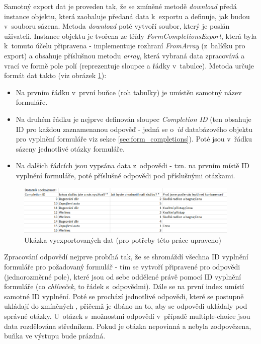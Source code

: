 			Samotný export dat je proveden tak, že se zmíněné metodě \textit{download} předá instance objektu, která zaobaluje předaná data k~exportu a definuje, jak budou v~souboru sázena. Metoda \textit{download} poté vytvoří soubor, který je poslán uživateli. Instance objektu je tvořena ze třídy \textit{FormCompletionsExport}, která byla k~tomuto účelu připravena - implementuje rozhraní \textit{FromArray} (z~balíčku pro export) a obsahuje příslušnou metodu \textit{array}, která vybraná data zpracovává a vrací ve formě pole polí (reprezentuje sloupce a řádky v~tabulce). Metoda určuje formát dat takto (viz obrázek \ref{fig:export_excel}):
			
			\begin{itemize}
				\item Na prvním řádku v~první buňce (roh tabulky) je umístěn samotný název formuláře.
				\item Na druhém řádku je nejprve definován sloupec \textit{Completion ID} (ten obsahuje ID pro každou zaznamenanou odpověď - jedná se o~\textit{id} databázového objektu pro vyplnění formuláře viz sekce \ref{sec:form_completions}). Poté jsou v~řádku sázeny jednotlivé otázky formuláře.
				\item Na dalších řádcích jsou vypsána data z~odpovědi - tzn. na prvním místě ID vyplnění formuláře, poté příslušné odpovědi pod příslušnými otázkami.
			\end{itemize}
		
			\begin{figure}[h]
				\centering
				\includegraphics[width=0.95\textwidth]{img/export_excel.png}
				\caption{Ukázka vyexportovaných dat (pro potřeby této práce upraveno)}
				\label{fig:export_excel}
			\end{figure}
		
			Zpracování odpovědí nejprve probíhá tak, že se shromáždí všechna ID vyplnění formuláře pro požadovaný formulář - tím se vytvoří připravené  pro odpovědi (jednorozměrné pole), které jsou od sebe oddělené právě pomocí ID vyplnění formuláře (co \textit{chlíveček}, to řádek s~odpovědmi). Dále se na první index  umístí samotné ID vyplnění. Poté se prochází jednotlivé odpovědi, které se postupně ukládají do zmíněných , přičemž je dbáno na to, aby se odpovědi ukládaly pod správné otázky. U~otázek s~možnostmi odpovědí v~případě multiple-choice jsou data rozdělována středníkem. Pokud je otázka nepovinná a nebyla zodpovězena, buňka ve výstupu bude prázdná. 
			
